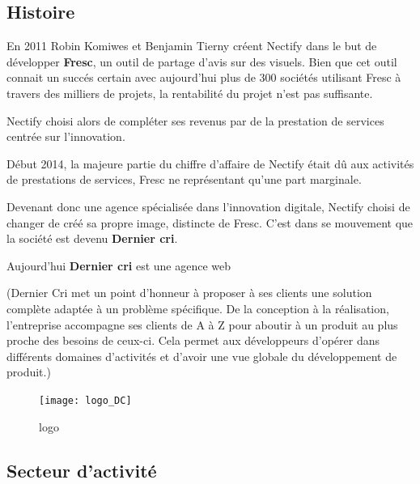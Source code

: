 \bigskip

\subsection{Histoire}\label{histoire}

\bigskip

En 2011 Robin Komiwes et Benjamin Tierny créent Nectify dans le but de
développer \textbf{Fresc}, un outil de partage d'avis sur des visuels.
Bien que cet outil connait un succés certain avec aujourd'hui plus de
300 sociétés utilisant Fresc à travers des milliers de projets, la
rentabilité du projet n'est pas suffisante.

\bigskip

Nectify choisi alors de compléter ses revenus par de la prestation de
services centrée sur l'innovation.

\bigskip

Début 2014, la majeure partie du chiffre d'affaire de Nectify était dû
aux activités de prestations de services, Fresc ne représentant qu'une
part marginale.

\bigskip

Devenant donc une agence spécialisée dans l'innovation digitale, Nectify
choisi de changer de créé sa propre image, distincte de Fresc. C'est
dans se mouvement que la société est devenu \textbf{Dernier cri}.

\bigskip

Aujourd'hui \textbf{Dernier cri} est une agence web

(Dernier Cri met un point d'honneur à proposer à ses clients une
solution complète adaptée à un problème spécifique. De la conception à
la réalisation, l'entreprise accompagne ses clients de A à Z pour
aboutir à un produit au plus proche des besoins de ceux-ci. Cela permet
aux développeurs d'opérer dans différents domaines d'activités et
d'avoir une vue globale du développement de produit.)

\bigskip

\begin{figure}
\centering
\texttt{[image: logo\_DC]}
\caption{logo}
\end{figure}

\newpage

\subsection{Secteur d'activité}\label{secteur-dactivituxe9}

\bigskip

